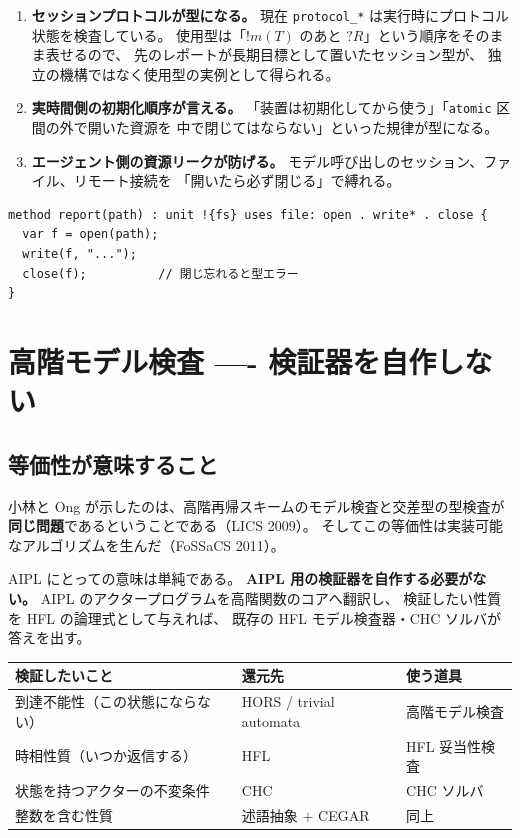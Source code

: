 \documentclass[11pt,a4paper]{ltjsarticle}
\theoremstyle{remark}
\begin{document}
\begin{enumerate}
\item \textbf{セッションプロトコルが型になる。}
  現在 \texttt{protocol\_*} は実行時にプロトコル状態を検査している。
  使用型は「$!m(T)$ のあと $?R$」という順序をそのまま表せるので、
  先のレポートが長期目標として置いたセッション型が、
  独立の機構ではなく使用型の実例として得られる。

\item \textbf{実時間側の初期化順序が言える。}
  「装置は初期化してから使う」「\texttt{atomic} 区間の外で開いた資源を
  中で閉じてはならない」といった規律が型になる。

\item \textbf{エージェント側の資源リークが防げる。}
  モデル呼び出しのセッション、ファイル、リモート接続を
  「開いたら必ず閉じる」で縛れる。
\end{enumerate}

\begin{lstlisting}[language=AIPL]
method report(path) : unit !{fs} uses file: open . write* . close {
  var f = open(path);
  write(f, "...");
  close(f);          // 閉じ忘れると型エラー
}
\end{lstlisting}

\section{高階モデル検査 ---- 検証器を自作しない}

\subsection{等価性が意味すること}

小林と Ong が示したのは、高階再帰スキームのモデル検査と交差型の型検査が
\textbf{同じ問題}であるということである（LICS 2009）。
そしてこの等価性は実装可能なアルゴリズムを生んだ（FoSSaCS 2011）。

AIPL にとっての意味は単純である。
\textbf{AIPL 用の検証器を自作する必要がない。}
AIPL のアクタープログラムを高階関数のコアへ翻訳し、
検証したい性質を HFL の論理式として与えれば、
既存の HFL モデル検査器・CHC ソルバが答えを出す。

\begin{center}
\small
\begin{tabular}{@{}lll@{}}
\toprule
検証したいこと & 還元先 & 使う道具 \\
\midrule
到達不能性（この状態にならない）& HORS / trivial automata & 高階モデル検査 \\
時相性質（いつか返信する）& HFL & HFL 妥当性検査 \\
状態を持つアクターの不変条件 & CHC & CHC ソルバ \\
整数を含む性質 & 述語抽象 $+$ CEGAR & 同上 \\
\bottomrule
\end{tabular}
\end{center}
\end{document}
